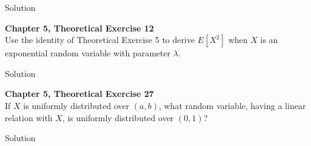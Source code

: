 \documentclass{article}
\begin{document}
\begin{spacing}{1.1}
\begin{homeworkProblem}
\begin{homeworkSection}{Solution}
  \end{homeworkSection}
\end{homeworkProblem}

\newpage
\begin{homeworkProblem}
  {\bf Chapter 5, Theoretical Exercise 12}\\
  Use the identity of Theoretical Exercise 5 to derive $E[ X^2]$ when $X$ 
  is an exponential random variable with parameter $\lambda$.
  \begin{homeworkSection}{Solution}
    
  \end{homeworkSection}
\end{homeworkProblem}

\newpage
\begin{homeworkProblem}
  {\bf Chapter 5, Theoretical Exercise 27}\\
  If $X$ is uniformly distributed over $(a, b)$, what random variable, 
  having a linear relation with $X$, is uniformly distributed over $(0, 1)$?
  \begin{homeworkSection}{Solution}
    
  \end{homeworkSection}
\end{homeworkProblem}
  
\end{spacing}
\end{document}
